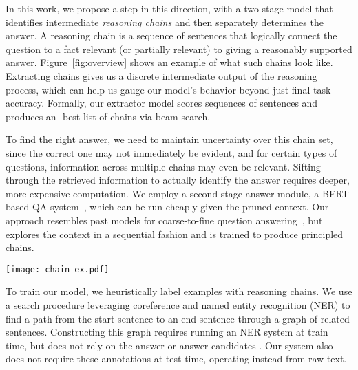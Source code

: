\documentclass[11pt,a4paper]{article}
\begin{document}
In this work, we propose a step in this direction, with a two-stage model that identifies intermediate \emph{reasoning chains} and then separately determines the answer. A reasoning chain is a sequence of sentences that logically connect the question to a fact relevant (or partially relevant) to giving a reasonably supported answer. Figure~\ref{fig:overview} shows an example of what such chains look like. Extracting chains gives us a discrete intermediate output of the reasoning process, which can help us gauge our model's behavior beyond just final task accuracy. Formally, our extractor model scores sequences of sentences and produces an -best list of chains via beam search.

To find the right answer, we need to maintain uncertainty over this chain set, since the correct one may not immediately be evident, and for certain types of questions, information across multiple chains may even be relevant. Sifting through the retrieved information to actually identify the answer requires deeper, more expensive computation. We employ a second-stage answer module, a BERT-based QA system~\citep{devlin2018bert}, which can be run cheaply given the pruned context. Our approach resembles past models for coarse-to-fine question answering~\citep{choi2017coarse, min2018efficient, wang2019evidence}, but explores the context in a sequential fashion and is trained to produce principled chains.



\begin{figure*}[t]
\centering
\texttt{[image: chain\_ex.pdf]}
\caption{A multi-hop example chosen from the HotpotQA development set. Several documents are given as context to answer a question. We show two possible ``reasoning chains'' that leverage connections (shared entities or coreference relations) between sentences to arrive at the answer. The first chain is most appropriate, while the second requires a less well-supported inferential leap.}
\vspace{-0.5cm}
    \label{fig:overview}
\end{figure*}

To train our model, we heuristically label examples with reasoning chains. We use a search procedure leveraging coreference and named entity recognition (NER) to find a path from the start sentence to an end sentence through a graph of related sentences. Constructing this graph requires running an NER system at train time, but does not rely on the answer or answer candidates \citep{kundu2018exploiting}. Our system also does not require these annotations at test time, operating instead from raw text.
\end{document}
